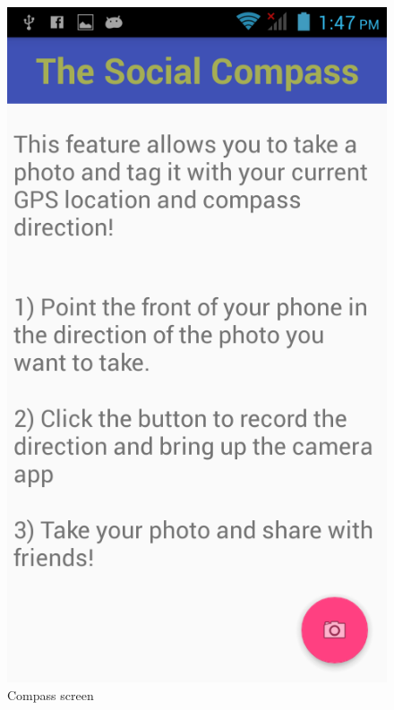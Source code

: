 \documentclass[12pt]{article}
\begin{document}
\begin{figure}[!htb]
\begin{minipage}[b]{.3\textwidth}
        \includegraphics[scale=1.2, width=\linewidth]{photo1.png}  
        \caption{Compass screen}  
    \end{minipage} 
    \hfill
    \begin{minipage}[b]{.3\textwidth}  
        \centering  

\end{minipage}
\end{figure}
\end{document}
